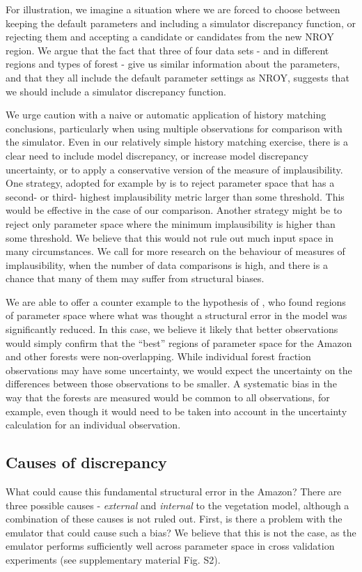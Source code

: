 \documentclass[esd, article]{copernicus} %
\begin{document}
For illustration, we imagine a situation where we are forced to choose between keeping the default parameters and including a simulator discrepancy function, or rejecting them and accepting a candidate or candidates from the new NROY region. We argue that the fact that three of four data sets - and in different regions and types of forest - give us similar information about the parameters, and that they all include the default parameter settings as NROY, suggests that we should include a simulator discrepancy function.

We urge caution with a naive or automatic application of history matching conclusions, particularly when using multiple observations for comparison with the simulator. Even in our relatively simple history matching exercise, there is a clear need to include model discrepancy, or increase model discrepancy uncertainty, or to apply a conservative version of the measure of implausibility. One strategy, adopted for example by \cite{vernon2014observable} is to reject parameter space that has a second- or third- highest implausibility metric larger than some threshold. This would be effective in the case of our comparison. Another strategy might be to reject only parameter space where the minimum implausibility is higher than some threshold. We believe that this would not rule out much input space in many circumstances. We call for more research on the behaviour of measures of implausibility, when the number of data comparisons is high, and there is a chance that many of them may suffer from structural biases. 

We are able to offer a counter example to the hypothesis of \cite{williamson2014identifying}, who found regions of parameter space where what was thought a structural error in the model was significantly reduced. In this case, we believe it likely that better observations would simply confirm that the ``best'' regions of parameter space for the Amazon and other forests were non-overlapping. While individual forest fraction observations may have some uncertainty, we would expect the uncertainty on the differences between those observations to be smaller. A systematic bias in the way that the forests are measured would be common to all observations, for example, even though it would need to be taken into account in the uncertainty calculation for an individual observation.

\subsection{Causes of discrepancy}\label{ssec:causes}
What could cause this fundamental structural error in the Amazon? There are three possible causes - \emph{external} and \emph{internal} to the vegetation model, although a combination of these causes is not ruled out. First, is there a problem with the emulator that could cause such a bias? We believe that this is not the case, as the emulator performs sufficiently well across parameter space in cross validation experiments (see supplementary material Fig. S2).
\end{document}

